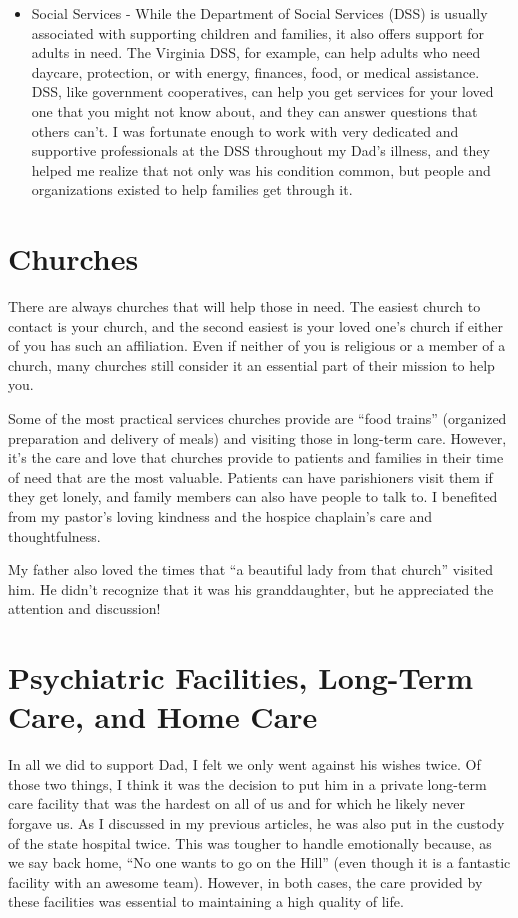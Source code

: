 \documentclass{article}
\begin{document}
\begin{itemize}
    \item Social Services - While the Department of Social Services (DSS) is usually associated with supporting children and families, it also offers support for adults in need. The Virginia DSS, for example, can help adults who need daycare, protection, or with energy, finances, food, or medical assistance. DSS, like government cooperatives, can help you get services for your loved one that you might not know about, and they can answer questions that others can't. I was fortunate enough to work with very dedicated and supportive professionals at the DSS throughout my Dad's illness, and they helped me realize that not only was his condition common, but people and organizations existed to help families get through it.
\end{itemize}

\section*{Churches}

There are always churches that will help those in need. The easiest church to contact is your church, and the second easiest is your loved one's church if either of you has such an affiliation. Even if neither of you is religious or a member of a church, many churches still consider it an essential part of their mission to help you.

Some of the most practical services churches provide are ``food trains'' (organized preparation and delivery of meals) and visiting those in long-term care. However, it's the care and love that churches provide to patients and families in their time of need that are the most valuable. Patients can have parishioners visit them if they get lonely, and family members can also have people to talk to. I benefited from my pastor's loving kindness and the hospice chaplain's care and thoughtfulness.

My father also loved the times that ``a beautiful lady from that church'' visited him. He didn't recognize that it was his granddaughter, but he appreciated the attention and discussion!

\section*{Psychiatric Facilities, Long-Term Care, and Home Care}

In all we did to support Dad, I felt we only went against his wishes twice. Of those two things, I think it was the decision to put him in a private long-term care facility that was the hardest on all of us and for which he likely never forgave us. As I discussed in my previous articles, he was also put in the custody of the state hospital twice. This was tougher to handle emotionally because, as we say back home, ``No one wants to go on the Hill'' (even though it is a fantastic facility with an awesome team). However, in both cases, the care provided by these facilities was essential to maintaining a high quality of life.
\end{document}
